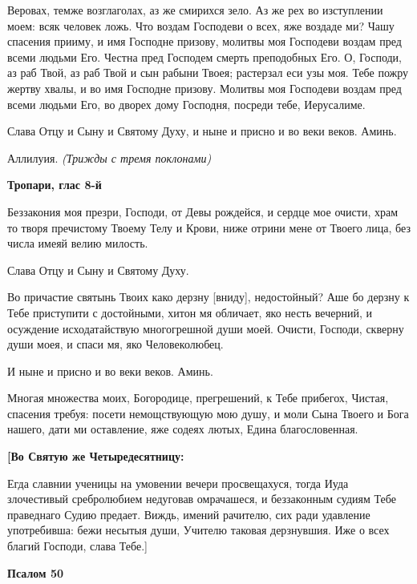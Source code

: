 Веровах, темже возглаголах, аз же смирихся зело. Аз же рех во изступлении моем: всяк человек ложь. Что воздам Господеви о всех, яже воздаде ми? Чашу спасения прииму, и имя Господне призову, молитвы моя Господеви воздам пред всеми людьми Его. Честна пред Господем смерть преподобных Его. О, Господи, аз раб Твой, аз раб Твой и сын рабыни Твоея; растерзал еси узы моя. Тебе пожру жертву хвалы, и во имя Господне призову. Молитвы моя Господеви воздам пред всеми людьми Его, во дворех дому Господня, посреди тебе, Иерусалиме.


Слава Отцу и Сыну и Святому Духу, и ныне и присно и во веки веков. Аминь.


Аллилуия. \itshape (Трижды с тремя поклонами)\normalfont{}




\bfseries Тропари, глас 8-й\normalfont{}


Беззакония моя презри, Господи, от Девы рождейся, и сердце мое очисти, храм то творя пречистому Твоему Телу и Крови, ниже отрини мене от Твоего лица, без числа имеяй велию милость.


Слава Отцу и Сыну и Святому Духу.


Во причастие святынь Твоих како дерзну [вниду], недостойный? Аше бо дерзну к Тебе приступити с достойными, хитон мя обличает, яко несть вечерний, и осуждение исходатайствую многогрешной души моей. Очисти, Господи, скверну души моея, и спаси мя, яко Человеколюбец.


И ныне и присно и во веки веков. Аминь.


Многая множества моих, Богородице, прегрешений, к Тебе прибегох, Чистая, спасения требуя: посети немощствующую мою душу, и моли Сына Твоего и Бога нашего, дати ми оставление, яже содеях лютых, Едина благословенная.




\bfseries [Во Святую же Четыредесятницу:\normalfont{}


Егда славнии ученицы на умовении вечери просвещахуся, тогда Иуда злочестивый сребролюбием недуговав омрачашеся, и беззаконным судиям Тебе праведнаго Судию предает. Виждь, имений рачителю, сих ради удавление употребивша: бежи несытыя души, Учителю таковая дерзнувшия. Иже о всех благий Господи, слава Тебе.]






\bfseries Псалом 50\normalfont{}


